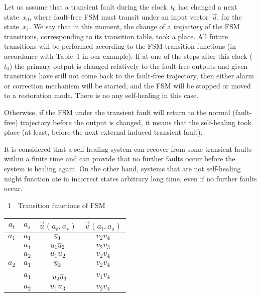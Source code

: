 \begin{multicols}{2}
Let us assume that a transient fault during the clock~$t_0$ has
changed a next state~$x_0$, where fault-free FSM must
transit under an input vector~$\vec u$, for the state~$x_1$.
We say that in this moment,  the change of a
{\it trajectory} of the FSM transitions, corresponding
to its transition table, took a place.
All future transitions will be performed according to
the FSM transition functions (in accordance with
Table~1 in our example).
If at one of the steps after this clock ($t_0$) the
primary output is changed relatively to the
fault-free outputs and given transitions have still
not come back to the fault-free trajectory, then
either alarm or correction mechanism will be started,
and the FSM will be stopped or moved to a
restoration mode.
There is no any self-healing in this case.



Otherwise, if the FSM under the transient fault
will return to the normal (fault-free) trajectory
before the output is changed, it means that the self-healing took place (at least, before the next
external induced transient fault).

It is considered that a self-healing system can
recover from some transient faults within a finite
time and can provide that no further faults occur before
the system is healing again.
On the other hand, systems that are not self-healing
might function ate in incorrect states arbitrary long time, even
if no further faults occur.

\pagebreak

\noindent
\begin{center} %
{{\tablename~1}\ \ \small{Transition functions of FSM}}
\vspace*{2ex}

{\small
\tabcolsep=9pt
\begin{tabular}{cccc}
\hline
 $a_t$  & $a_s$  & $\vec{u}(a_t,a_s)$ & $\vec v(a_t,a_s)$     \\
\hline
 $a_1$  &  $a_1$  & $\overline u_1$        & $v_2v_4$         \\
            & $a_1$  & $u_1\overline u_2$     & $v_2v_3$         \\
            &  $a_2$  & $u_1u_2$     & $v_2v_4$         \\
\hline
 $a_2$  & $a_1$  & $\overline u_2$        & $v_2v_4$         \\
            &  $a_1$  &\ $u_2\overline u_3$     & $v_1v_4$         \\
            &  $a_2$  & $u_1u_3$     & $v_2v_4$         \\
\hline
\end{tabular}
}
\end{center}


\end{multicols}
